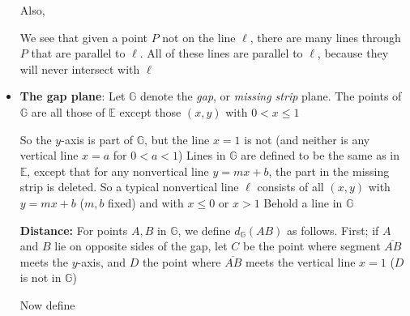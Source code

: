\documentclass{report}
\begin{document}
\begin{itemize}
            \bigbreak \noindent 
            Also,
            \bigbreak \noindent 
            \begin{figure}[ht]
                \centering
                \label{fig:play}
            \end{figure}
            \bigbreak \noindent 
            We see that given a point $P$ not on the line $\ell$, there are many lines through $P$ that are parallel to $\ell$. All of these lines are parallel to $\ell$, because they will never intersect with $\ell$
        \item \textbf{The gap plane}: Let $\mathbb{G}$ denote the \textit{gap}, or \textit{missing strip} plane. The points of $\mathbb{G}$ are all those of $\mathbb{E}$ except those $(x,y)$ with $0< x \leq 1$
            \bigbreak \noindent 
            \begin{figure}[ht]
                \centering
                \label{fig:gap}
            \end{figure}
            So the $y$-axis is part of $\mathbb{G}$, but the line $x=1$ is not (and neither is any vertical line $x=a$ for $0 < a < 1$)
            \bigbreak \noindent 
            Lines in $\mathbb{G}$ are defined to be the same as in $\mathbb{E}$, except that for any nonvertical line $y=mx+b$, the part in the missing strip is deleted. So a typical nonvertical line $\ell$ consists of all $(x,y)$ with $y=mx+b$ ($m,b$ fixed) and with $x \leq 0$ or $x > 1$
            \bigbreak \noindent 
            Behold a line in $\mathbb{G}$
            \bigbreak \noindent 
            \begin{figure}[ht]
                \centering
                \label{fig:behold}
            \end{figure}
            \bigbreak \noindent 
            \textbf{Distance:} For points $A,B$ in $\mathbb{G}$, we define $d_{\mathbb{G}}(AB)$ as follows. First; if $A$ and $B$ lie on opposite sides of the gap, let $C$ be the point where segment $\overline{AB} $ meets the $y$-axis, and $D$ the point where $\overline{AB}$ meets the vertical line $x=1$ ($D$ is not in $\mathbb{G}$)
            \bigbreak \noindent 
            \begin{figure}[ht]
                \centering
                \label{fig:ex1}
            \end{figure}
            \bigbreak \noindent 
            Now define
            \begin{align*}

\end{align*}
\end{itemize}
\end{document}
